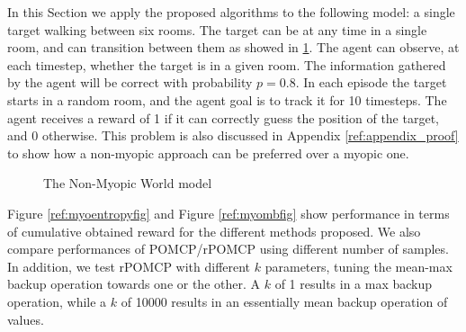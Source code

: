 In this Section we apply the proposed algorithms to the following model: a single target walking
between six rooms. The target can be at any time in a single room, and can transition between them
as showed in \ref{ref:nonmyo1}. The agent can observe, at each timestep, whether the target is in a
given room. The information gathered by the agent will be correct with probability $p=0.8$. In each
episode the target starts in a random room, and the agent goal is to track it for 10 timesteps. The
agent receives a reward of 1 if it can correctly guess the position of the target, and 0 otherwise.
This problem is also discussed in Appendix \ref{ref:appendix_proof} to show how a non-myopic
approach can be preferred over a myopic one.

\begin{figure}[ht]
\centering
{}
\caption{The Non-Myopic World model}
\label{ref:nonmyo1}
\end{figure}

Figure \ref{ref:myoentropyfig} and Figure \ref{ref:myombfig} show performance in terms of cumulative
obtained reward for the different methods proposed. We also compare performances of POMCP/rPOMCP
using different number of samples. In addition, we test rPOMCP with different $k$ parameters, tuning
the mean-max backup operation towards one or the other. A $k$ of 1  results in a max backup
operation, while a $k$ of 10000 results in an essentially mean backup operation of values.


